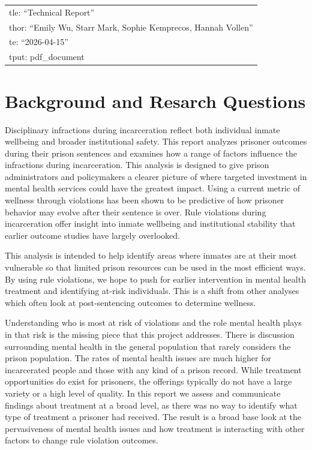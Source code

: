 \documentclass[
]{article}
\author{}
\date{\vspace{-2.5em}}
\begin{document}
\begin{longtable}[]{@{}l@{}}
\toprule\noalign{}
\endhead
\bottomrule\noalign{}
\endlastfoot
tle: ``Technical Report'' \\
thor: ``Emily Wu, Starr Mark, Sophie Kemprecos, Hannah Vollen'' \\
te: ``2026-04-15'' \\
tput: pdf\_document \\
\end{longtable}

\section{Background and Resarch
Questions}\label{background-and-resarch-questions}

Disciplinary infractions during incarceration reflect both individual
inmate wellbeing and broader institutional safety. This report analyzes
prisoner outcomes during their prison sentences and examines how a range
of factors influence the infractions during incarceration. This analysis
is designed to give prison administrators and policymakers a clearer
picture of where targeted investment in mental health services could
have the greatest impact. Using a current metric of wellness through
violations has been shown to be predictive of how prisoner behavior may
evolve after their sentence is over. Rule violations during
incarceration offer insight into inmate wellbeing and institutional
stability that earlier outcome studies have largely overlooked.

This analysis is intended to help identify areas where inmates are at
their most vulnerable so that limited prison resources can be used in
the most efficient ways. By using rule violations, we hope to push for
earlier intervention in mental health treatment and identifying at-risk
individuals. This is a shift from other analyses which often look at
post-sentencing outcomes to determine wellness.

Understanding who is most at risk of violations and the role mental
health plays in that risk is the missing piece that this project
addresses. There is discussion surrounding mental health in the general
population that rarely considers the prison population. The rates of
mental health issues are much higher for incarcerated people and those
with any kind of a prison record. While treatment opportunities do exist
for prisoners, the offerings typically do not have a large variety or a
high level of quality. In this report we assess and communicate findings
about treatment at a broad level, as there was no way to identify what
type of treatment a prisoner had received. The result is a broad base
look at the pervasiveness of mental health issues and how treatment is
interacting with other factors to change rule violation outcomes.
\end{document}
